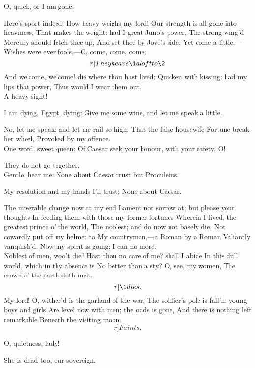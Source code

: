 \documentclass{book}
\begin{document}
\1	O, quick, or I am gone.

\2	Here's sport indeed! How heavy weighs my lord!
	Our strength is all gone into heaviness,
	That makes the weight: had I great Juno's power,
	The strong-wing'd Mercury should fetch thee up,
	And set thee by Jove's side. Yet come a little,---
	Wishes were ever fools,---O, come, come, come;
	\[r]They heave \1 aloft to \2\]
	And welcome, welcome! die where thou hast lived:
	Quicken with kissing: had my lips that power,
	Thus would I wear them out. \\

	A heavy sight!

\1	I am dying, Egypt, dying:
	Give me some wine, and let me speak a little.

\2	No, let me speak; and let me rail so high,
	That the false housewife Fortune break her wheel,
	Provoked by my offence. \\

\1	One word, sweet queen:
	Of Caesar seek your honour, with your safety. O!

\2	They do not go together. \\

\1	Gentle, hear me:
	None about Caesar trust but Proculeius.

\2	My resolution and my hands I'll trust;
	None about Caesar.

\1	The miserable change now at my end
	Lament nor sorrow at; but please your thoughts
	In feeding them with those my former fortunes
	Wherein I lived, the greatest prince o' the world,
	The noblest; and do now not basely die,
	Not cowardly put off my helmet to
	My countryman,---a Roman by a Roman
	Valiantly vanquish'd. Now my spirit is going;
	I can no more. \\

\2	                  Noblest of men, woo't die?
	Hast thou no care of me? shall I abide
	In this dull world, which in thy absence is
	No better than a sty? O, see, my women, 
	The crown o' the earth doth melt. \\ \[r]\1 dies.\]
                                        My lord!
	O, wither'd is the garland of the war,
	The soldier's pole is fall'n: young boys and girls
	Are level now with men; the odds is gone,
	And there is nothing left remarkable
	Beneath the visiting moon. \\  \[r]Faints.\]

\7	O, quietness, lady!

	She is dead too, our sovereign. \\
\end{document}

